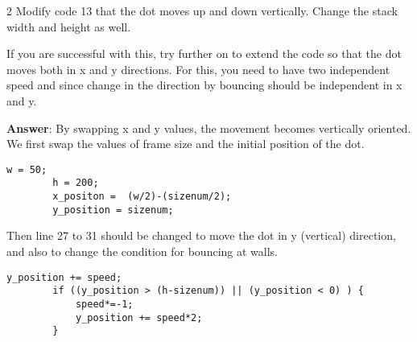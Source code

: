 \begin{indentexercise}
{2}
Modify code 13 that the dot moves up and down vertically. Change the stack width and height as well. 

If you are successful with this, try further on to extend the code so that the dot moves both in x and y directions. For this, you need to have two independent speed  and  since change in the direction by bouncing should be independent in x and y. 

\item \textbf{Answer}: By swapping x and y values, the movement becomes vertically oriented. We first swap the values of frame size and the initial position of the dot.  
	\begin{lstlisting}[numbers=none]
		w = 50;
		h = 200;
		x_positon =  (w/2)-(sizenum/2);
		y_position = sizenum;
	\end{lstlisting}
	Then line 27 to 31 should be changed to move the dot in y (vertical) direction, and also to change the condition for bouncing at walls.
	\begin{lstlisting}[numbers=none]
		y_position += speed;
		if ((y_position > (h-sizenum)) || (y_position < 0) ) { 
			speed*=-1;
			y_position += speed*2;
		}
	\end{lstlisting}

\end{indentexercise}

\newpage